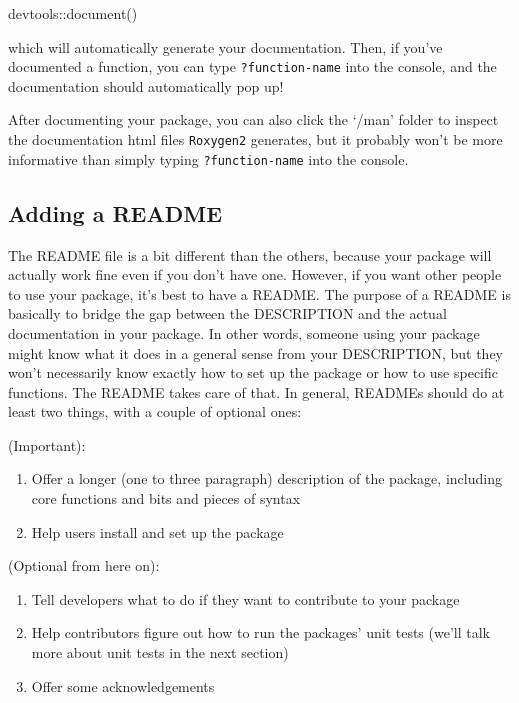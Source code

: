 \documentclass[
]{book}
\newenvironment{Shaded}{\begin{snugshade}}{\end{snugshade}}
\newcommand{\FunctionTok}[1]{\textcolor[rgb]{0.00,0.00,0.00}{#1}}
\newcommand{\NormalTok}[1]{#1}
\newcommand{\SpecialCharTok}[1]{\textcolor[rgb]{0.00,0.00,0.00}{#1}}
\providecommand{\tightlist}{%
  \setlength{\itemsep}{0pt}\setlength{\parskip}{0pt}}
\begin{document}
\begin{Shaded}
\begin{Highlighting}[]
\NormalTok{devtools}\SpecialCharTok{::}\FunctionTok{document}\NormalTok{()}
\end{Highlighting}
\end{Shaded}

which will automatically generate your documentation. Then, if you've documented a function, you can type \texttt{?function-name} into the console, and the documentation should automatically pop up!

After documenting your package, you can also click the `/man' folder to inspect the documentation html files \texttt{Roxygen2} generates, but it probably won't be more informative than simply typing \texttt{?function-name} into the console.

\hypertarget{adding-a-readme}{%
\subsection{Adding a README}\label{adding-a-readme}}

The README file is a bit different than the others, because your package will actually work fine even if you don't have one. However, if you want other people to use your package, it's best to have a README. The purpose of a README is basically to bridge the gap between the DESCRIPTION and the actual documentation in your package. In other words, someone using your package might know what it does in a general sense from your DESCRIPTION, but they won't necessarily know exactly how to set up the package or how to use specific functions. The README takes care of that. In general, READMEs should do at least two things, with a couple of optional ones:

(Important):

\begin{enumerate}
\def\labelenumi{\arabic{enumi}.}
\tightlist
\item
  Offer a longer (one to three paragraph) description of the package, including core functions and bits and pieces of syntax
\item
  Help users install and set up the package
\end{enumerate}

(Optional from here on):

\begin{enumerate}
\def\labelenumi{\arabic{enumi}.}
\setcounter{enumi}{2}
\tightlist
\item
  Tell developers what to do if they want to contribute to your package
\item
  Help contributors figure out how to run the packages' unit tests (we'll talk more about unit tests in the next section)
\item
  Offer some acknowledgements
\end{enumerate}
\end{document}
